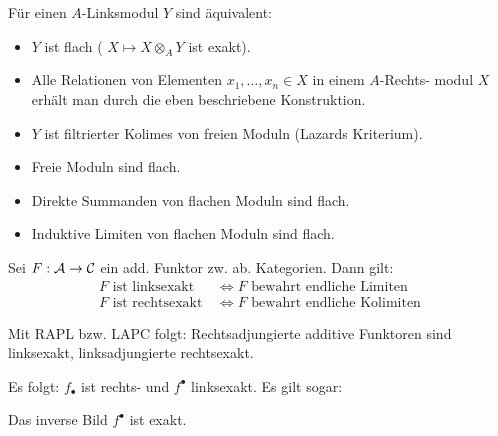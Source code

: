 \documentclass{cheat-sheet}
\begin{document}
\begin{lem}
  Für einen $A$-Linksmodul $Y$ sind äquivalent:
  \begin{itemize}
    \item $Y$ ist flach (\dh{} $X \mapsto X \otimes_A Y$ ist exakt).
    \item Alle Relationen von Elementen $x_1, \ldots, x_n \in X$ in einem $A$-Rechts- modul $X$ erhält man durch die eben beschriebene Konstruktion.
    \item $Y$ ist filtrierter Kolimes von freien Moduln (Lazards Kriterium).
  \end{itemize}
\end{lem}

\begin{lem}
  \begin{itemize}
    \item Freie Moduln sind flach.
    \item Direkte Summanden von flachen Moduln sind flach.
    \item Induktive Limiten von flachen Moduln sind flach.
  \end{itemize}
\end{lem}


\begin{lem}
  Sei $F : \mathcal{A} \to \mathcal{C}$ ein add. Funktor zw. ab. Kategorien. Dann gilt:
  \begin{align*}
    \text{$F$ ist linksexakt} & \, \iff \text{$F$ bewahrt endliche Limiten} \\
    \text{$F$ ist rechtsexakt} & \, \iff \text{$F$ bewahrt endliche Kolimiten}
  \end{align*}
\end{lem}

\begin{kor}
  Mit RAPL bzw. LAPC folgt: Rechtsadjungierte additive Funktoren sind linksexakt, linksadjungierte rechtsexakt.
\end{kor}

\begin{bem}
  Es folgt: $f_\bullet$ ist rechts- und $f^\bullet$ linksexakt. Es gilt sogar:
\end{bem}

\begin{lem}
  Das inverse Bild $f^\bullet$ ist exakt.
\end{lem}
\end{document}
